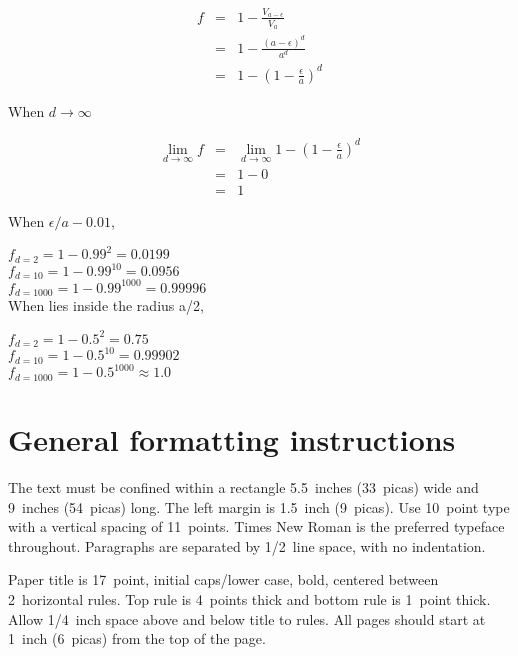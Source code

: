 \documentclass{article} %
\begin{document}
\begin{equation}
    \begin{array}{rcl}
     	f & = & 1 - \frac{V_{a-\epsilon}}{V_a}  \\
	& = &  1 - \frac{{(a-\epsilon)}^{d}}{a^d}\\
	& = & 1 - (1-\frac{\epsilon}{a})^d
    \end{array}
\end{equation}

When $d \to \infty$

\begin{equation}
    \begin{array}{rcl}
     	\lim\limits_{d \to \infty}^{} f & = & \lim\limits_{d \to \infty}^{}  1 - (1-\frac{\epsilon}{a})^d \\
	& = & 1 - 0 \\
	& = & 1
    \end{array}
\end{equation}

When $\epsilon / a - 0.01$,

$f_{d=2} = 1 - 0.99^2 = 0.0199$ \\
$f_{d=10} = 1 - 0.99^10 = 0.0956$ \\
$f_{d=1000} = 1 - 0.99^1000 = 0.99996$ \\

When lies inside the radius a/2,

$f_{d=2} = 1 - 0.5^2 = 0.75$ \\
$f_{d=10} = 1 - 0.5^10 = 0.99902$ \\
$f_{d=1000} = 1 - 0.5^1000 \approx 1.0$ \\


\subsection{}



\section{General formatting instructions}
\label{gen_inst}

The text must be confined within a rectangle 5.5~inches (33~picas) wide and
9~inches (54~picas) long. The left margin is 1.5~inch (9~picas).
Use 10~point type with a vertical spacing of 11~points. Times New Roman is the
preferred typeface throughout. Paragraphs are separated by 1/2~line space,
with no indentation.

Paper title is 17~point, initial caps/lower case, bold, centered between
2~horizontal rules. Top rule is 4~points thick and bottom rule is 1~point
thick. Allow 1/4~inch space above and below title to rules. All pages should
start at 1~inch (6~picas) from the top of the page.
\end{document}

